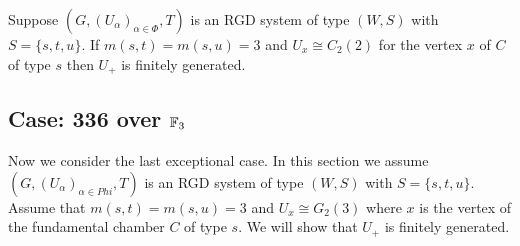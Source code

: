 \documentclass[class=book, crop=false]{standalone}
\begin{document}
\begin{cor}
	Suppose $(G,(U_\alpha)_{\alpha\in \Phi},T)$ is an RGD system of type $(W,S)$ with $S=\{s,t,u\}.$ If $m(s,t)=m(s,u)=3$ and $U_x\cong C_2(2)$ for the vertex $x$ of $C$ of type $s$ then $U_+$ is finitely generated.
\end{cor}

\subsection{Case: 336 over $\mathbb{F}_{3}$}

Now we consider the last exceptional case. In this section we assume $(G,(U_\alpha)_{\alpha\in Phi},T)$ is an RGD system of type $(W,S)$ with $S=\{s,t,u\}.$ Assume that $m(s,t)=m(s,u)=3$ and $U_x\cong G_2(3)$ where $x$ is the vertex of the fundamental chamber $C$ of type $s.$ We will show that $U_+$ is finitely generated.
\end{document}

